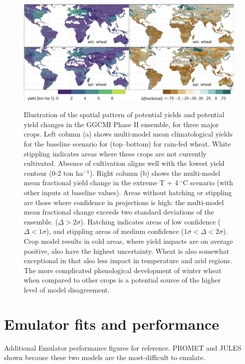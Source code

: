 \documentclass[10pt]{article}
\begin{document}
{\begin{figure}[h!]
\includegraphics[width=\textwidth]{s_wheat_baseline.png}\\
\caption{Illustration of the spatial pattern of potential yields and potential yield changes in the GGCMI Phase II ensemble, for three major crops. Left column (a) shows multi-model mean climatological yields for the baseline scenario for (top--bottom) for rain-fed wheat. White stippling indicates areas where these crops are not currently cultivated. Absence of cultivation aligns well with the lowest yield contour (0-2 ton ha$^{-1}$). Right column (b) shows the multi-model mean fractional yield change in the extreme T + 4 $^{\circ}$C scenario (with other inputs at baseline values). Areas without hatching or stippling are those where confidence in projections is high: the multi-model mean fractional change exceeds two standard deviations of the ensemble. ($\Delta > 2\sigma$). Hatching indicates areas of low confidence ($\Delta < 1 \sigma$), and stippling areas of medium confidence ($1 \sigma < \Delta < 2 \sigma$). Crop model results in cold areas, where yield impacts are on average positive, also have the highest uncertainty. Wheat is also somewhat exceptional in that  also less impact in temperature and arid regions. The more complicated phenological development of winter wheat when compared to other crops is a potential source of the higher level of model disagreement.}
\label{fig:wheatbaseline}
\end{figure}

\clearpage
\section{Emulator fits and performance}
Additional Emulator performance figures for reference. PROMET and JULES shown because these two models are the most-difficult to emulate.

}
\end{document}
